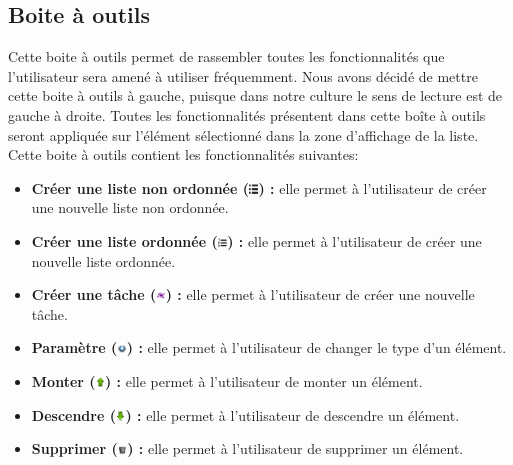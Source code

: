 \documentclass[a4paper,10pt]{article}
\begin{document}
\subsection{Boite à outils}
Cette boite à outils permet de rassembler toutes les fonctionnalités que l'utilisateur sera amené à utiliser fréquemment. Nous avons décidé de mettre cette boite à outils à gauche, puisque dans notre culture le sens de lecture est de gauche à droite. Toutes les fonctionnalités présentent dans cette boîte à outils seront appliquée sur l'élément sélectionné dans la zone d'affichage de la liste. Cette boite à outils contient les fonctionnalités suivantes:
\begin{itemize}
\item \textbf{Créer une liste non ordonnée (\includegraphics[width=0.25cm]{Images/list.png}) :} elle permet à l'utilisateur de créer une nouvelle liste non ordonnée.
\item \textbf{Créer une liste ordonnée (\includegraphics[width=0.25cm]{Images/list_ordered.png}) :} elle permet à l'utilisateur de créer une nouvelle liste ordonnée.
\item \textbf{Créer une tâche (\includegraphics[width=0.25cm]{Images/task.png}) :} elle permet à l'utilisateur de créer une nouvelle tâche.
\item \textbf{Paramètre (\includegraphics[width=0.25cm]{Images/gnome-system.png}) :} elle permet à l'utilisateur de changer le type d'un élément.
\item \textbf{Monter (\includegraphics[width=0.25cm]{Images/arrow_up.png}) :} elle permet à l'utilisateur de monter un élément.
\item \textbf{Descendre  (\includegraphics[width=0.25cm]{Images/arrow_down.png}) :} elle permet à l'utilisateur de descendre un élément.
\item \textbf{Supprimer  (\includegraphics[width=0.25cm]{Images/trash_empty.png}) :}  elle permet à l'utilisateur de supprimer un élément.
\end{itemize}
\end{document}
